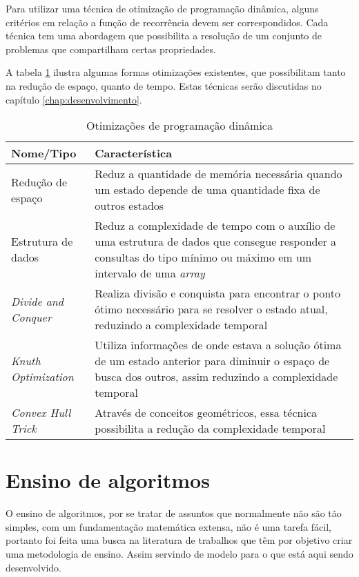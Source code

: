 Para utilizar uma técnica de otimização de programação dinâmica, alguns critérios em relação a função de recorrência devem ser correspondidos. Cada técnica tem uma abordagem que possibilita a resolução de um conjunto de problemas que compartilham certas propriedades.

A tabela \ref{tab:otimizacoes} ilustra algumas formas otimizações existentes, que possibilitam tanto na redução de espaço, quanto de tempo. Estas técnicas serão discutidas no capítulo \ref{chap:desenvolvimento}.

\begin{table}[H]
	\centering
	\caption[Otimizações de programação dinâmica]{Otimizações de programação dinâmica}
	\label{tab:otimizacoes}
	\begin{tabular}{p{4cm} | p{11cm}}
		\hline \SPACE
		\textbf{Nome/Tipo} & \textbf{Característica} \\ \hline \SPACE
		Redução de espaço &  Reduz a quantidade de memória necessária quando um estado depende de uma quantidade fixa de outros estados \\ \hline \SPACE
		Estrutura de dados &  Reduz a complexidade de tempo com o auxílio de uma estrutura de dados que consegue responder a consultas do tipo mínimo ou máximo em um intervalo de uma \textit{array}  \\ \hline \SPACE
		\textit{Divide and Conquer} & Realiza divisão e conquista para encontrar o ponto ótimo necessário para se resolver o estado atual, reduzindo a complexidade temporal \\ \hline \SPACE
		\textit{Knuth Optimization} & Utiliza informações de onde estava a solução ótima de um estado anterior para diminuir o espaço de busca dos outros, assim reduzindo a complexidade temporal  \\ \hline \SPACE
		\textit{Convex Hull Trick} & Através de conceitos geométricos, essa técnica possibilita a redução da complexidade temporal \\ \hline 
	\end{tabular}
	
\end{table}

\section{Ensino de algoritmos}
\label{sec:ensino}

O ensino de algoritmos, por se tratar de assuntos que normalmente não são tão simples, com um fundamentação matemática extensa, não é uma tarefa fácil, portanto foi feita uma busca na literatura de trabalhos que têm por objetivo criar uma metodologia de ensino. Assim servindo de modelo para o que está aqui sendo desenvolvido.


